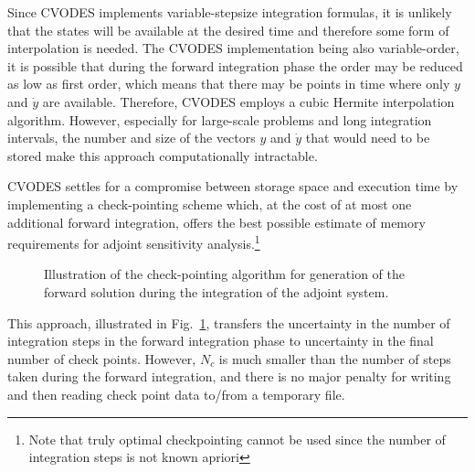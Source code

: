 Since CVODES implements variable-stepsize integration formulas,
it is unlikely that the states will be available at the desired time and
therefore some form of interpolation is needed. The CVODES implementation
being also variable-order, it is possible that during the forward
integration phase the order may be reduced as low as first order,
which means that there may be points in time where only $y$ and ${\dot y}$
are available. Therefore, CVODES employs a cubic Hermite interpolation
algorithm. However, especially for large-scale problems and long integration
intervals, the number and size of the vectors $y$ and ${\dot y}$ that would 
need to be stored make this approach computationally intractable. 

CVODES settles for a compromise between storage space and execution time by
implementing a check-pointing scheme which, at the cost of
at most one additional forward integration, offers the best possible 
estimate of memory requirements for adjoint sensitivity
analysis.\footnote{Note that truly optimal checkpointing \cite{GrWa:00}
cannot be used since the number of integration steps is not known apriori}

%
\begin{figure}
\centerline{}
\caption {Illustration of the check-pointing algorithm for generation of 
  the forward solution during the integration of the adjoint system.}
\label{f:ckpnt}
\end{figure}
This approach, illustrated in Fig.~\ref{f:ckpnt}, transfers the uncertainty in the number of integration
steps in the forward integration phase to uncertainty in the final number of check 
points. However, $N_c$ is much smaller than the number of steps taken during
the forward integration, and there is no major penalty for writing and then reading
check point data to/from a temporary file.
%


